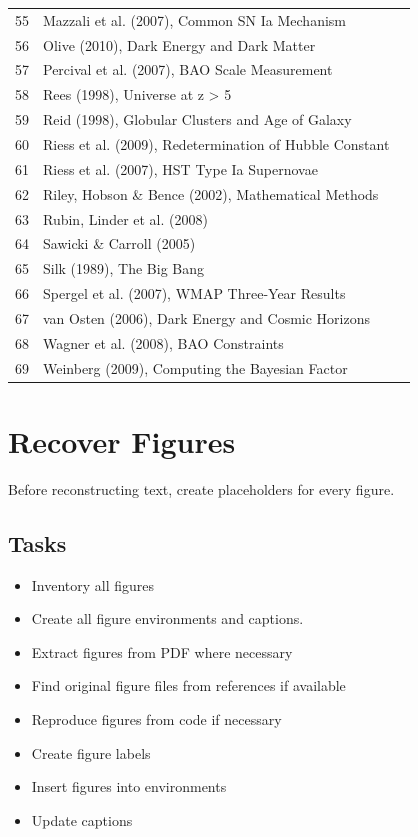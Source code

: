 \documentclass{article}
\newcommand{\done}{\textcolor{green!60!black}{\ding{51}}}
\newcommand{\pending}{$\square$}
\begin{document}
\begin{longtable}{|r|p{8cm}|c|}
55 & Mazzali et al. (2007), Common SN Ia Mechanism & \done \\
56 & Olive (2010), Dark Energy and Dark Matter & \done \\
57 & Percival et al. (2007), BAO Scale Measurement & \done \\
58 & Rees (1998), Universe at z > 5 & \done \\
59 & Reid (1998), Globular Clusters and Age of Galaxy & \done \\
60 & Riess et al. (2009), Redetermination of Hubble Constant & \done \\
61 & Riess et al. (2007), HST Type Ia Supernovae & \done \\
62 & Riley, Hobson \& Bence (2002), Mathematical Methods & \done \\
63 & Rubin, Linder et al. (2008) & \done \\
64 & Sawicki \& Carroll (2005) & \done \\
65 & Silk (1989), The Big Bang & \done \\
66 & Spergel et al. (2007), WMAP Three-Year Results & \done \\
67 & van Osten (2006), Dark Energy and Cosmic Horizons & \done \\
68 & Wagner et al. (2008), BAO Constraints & \done \\
69 & Weinberg (2009), Computing the Bayesian Factor & \done \\
\hline
\end{longtable}


\section{\done Recover Figures}

Before reconstructing text, create placeholders for every figure.

\subsection{Tasks}
\begin{itemize}
\item[\done] Inventory all figures
\item[\done] Create all figure environments and captions.
\item[\done] Extract figures from PDF where necessary
\item[\pending] Find original figure files from references if available
\item[\pending] Reproduce figures from code if necessary
\item[\done] Create figure labels
\item[\done] Insert figures into environments
\item[\done] Update captions
\end{itemize}
\end{document}
